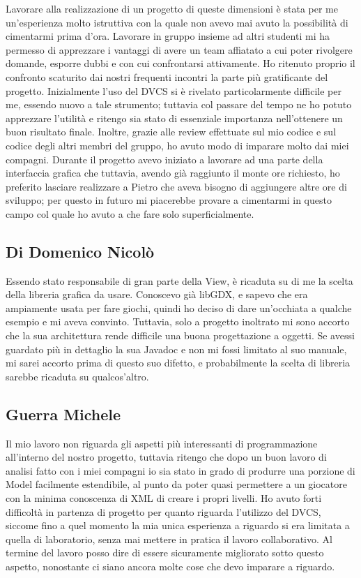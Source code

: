 Lavorare alla realizzazione di un progetto di queste dimensioni è stata per me
un'esperienza molto istruttiva con la quale non avevo mai avuto la possibilità
di cimentarmi prima d'ora. Lavorare in gruppo insieme ad altri studenti mi ha
permesso di apprezzare i vantaggi di avere un team affiatato a cui poter
rivolgere domande, esporre dubbi e con cui confrontarsi attivamente. Ho
ritenuto proprio il confronto scaturito dai nostri frequenti incontri la parte
più gratificante del progetto. Inizialmente l'uso del DVCS si è rivelato
particolarmente difficile per me, essendo nuovo a tale strumento; tuttavia col
passare del tempo ne ho potuto apprezzare l'utilità e ritengo sia stato di
essenziale importanza nell'ottenere un buon risultato finale. Inoltre, grazie
alle review effettuate sul mio codice e sul codice degli altri membri del
gruppo, ho avuto modo di imparare molto dai miei compagni. Durante il progetto
avevo iniziato a lavorare ad una parte della interfaccia grafica che tuttavia,
avendo già raggiunto il monte ore richiesto, ho preferito lasciare realizzare a
Pietro che aveva bisogno di aggiungere altre ore di sviluppo; per questo in
futuro mi piacerebbe provare a cimentarmi in questo campo col quale ho avuto a
che fare solo superficialmente.

\subsection{Di Domenico Nicolò}

Essendo stato responsabile di gran parte della View, è ricaduta su di me la
scelta della libreria grafica da usare. Conoscevo già libGDX, e sapevo che era
ampiamente usata per fare giochi, quindi ho deciso di dare un'occhiata a
qualche esempio e mi aveva convinto. Tuttavia, solo a progetto inoltrato mi
sono accorto che la sua architettura rende difficile una buona progettazione a
oggetti. Se avessi guardato più in dettaglio la sua Javadoc e non mi fossi
limitato al suo manuale, mi sarei accorto prima di questo suo difetto, e
probabilmente la scelta di libreria sarebbe ricaduta su qualcos'altro.

\subsection{Guerra Michele}

Il mio lavoro non riguarda gli aspetti più interessanti di programmazione
all'interno del nostro progetto, tuttavia ritengo che dopo un buon lavoro di
analisi fatto con i miei compagni io sia stato in grado di produrre una
porzione di Model facilmente estendibile, al punto da poter quasi permettere a
un giocatore con la minima conoscenza di XML di creare i propri livelli. Ho
avuto forti difficoltà in partenza di progetto per quanto riguarda l'utilizzo
del DVCS, siccome fino a quel momento la mia unica esperienza a riguardo si era
limitata a quella di laboratorio, senza mai mettere in pratica il lavoro
collaborativo. Al termine del lavoro posso dire di essere sicuramente
migliorato sotto questo aspetto, nonostante ci siano ancora molte cose che devo
imparare a riguardo.

